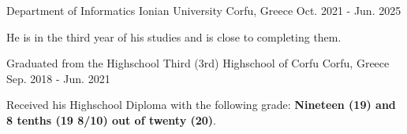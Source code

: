 

\begin{cventries}

  \cventry
    {Department of Informatics} %
    {Ionian University} %
    {Corfu, Greece} %
    {Oct. 2021 - Jun. 2025} %
    {
      \begin{cvitems} %
        \item {He is in the third year of his studies and is close to completing them.}
      \end{cvitems}
    }


  \cventry
    {Graduated from the Highschool} %
    {Third (3rd) Highschool of Corfu} %
    {Corfu, Greece} %
    {Sep. 2018 - Jun. 2021} %
    {
      \begin{cvitems} %
        \item {Received his Highschool Diploma with the following grade: \textbf{Nineteen (19) and 8 tenths (19 8/10) out of twenty (20)}.}
      \end{cvitems}
    }

\end{cventries}
